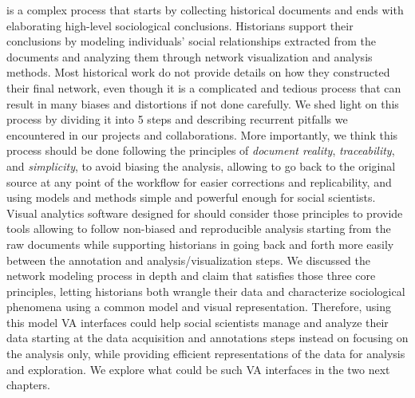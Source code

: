 \hsna is a complex process that starts by collecting historical documents and ends with elaborating high-level sociological conclusions.
Historians support their conclusions by modeling individuals' social relationships extracted from the documents and analyzing them through network visualization and analysis methods.
Most historical work do not provide details on how they constructed their final network, even though it is a complicated and tedious process that can result in many biases and distortions if not done carefully\cite{alkadi2022}.
We shed light on this process by dividing it into 5 steps and describing recurrent pitfalls we encountered in our projects and collaborations.
More importantly, we think this process should be done following the principles of \textit{document reality}, \textit{traceability}, and \textit{simplicity}, to avoid biasing the analysis, allowing to go back to the original source at any point of the workflow for easier corrections and replicability, and using models and methods simple and powerful enough for social scientists.
Visual analytics software designed for \hsna should consider those principles to provide tools allowing to follow non-biased and reproducible analysis starting from the raw documents while supporting historians in going back and forth more easily between the annotation and analysis/visualization steps.
We discussed the network modeling process in depth and claim that \modelplural satisfies those three core principles, letting historians both wrangle their data and characterize sociological phenomena using a common model and visual representation.
Therefore, using this model VA interfaces could help social scientists manage and analyze their data starting at the data acquisition and annotations steps instead on focusing on the analysis only, while providing efficient representations of the data for analysis and exploration.
We explore what could be such VA interfaces in the two next chapters.
